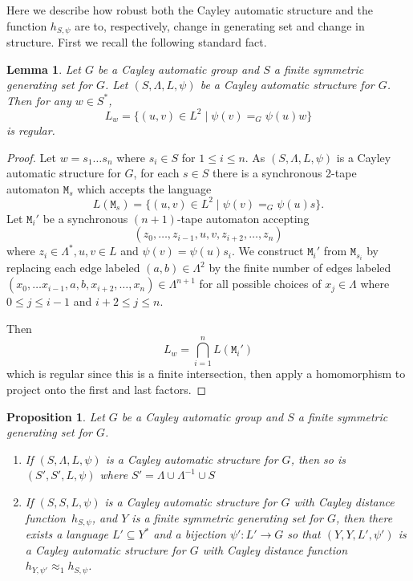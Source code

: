 \documentclass[11pt]{amsart}
\newcommand{\be}{\begin{enumerate}}
\newcommand{\ee}{\end{enumerate}}
\newcommand{\approxF}{\approx_1}
\newtheorem{lemma}[theorem]{Lemma}
\newtheorem{proposition}[theorem]{Proposition}
\theoremstyle{definition}
\newcommand\distfun{Cayley distance function}
\begin{document}
Here we describe how robust both the Cayley automatic structure and the function $h_{S,\psi}$ are to, respectively, change in generating set and change in structure.
First we recall the following standard fact.
\begin{lemma}\label{lem:2tape}
Let $G$ be a Cayley automatic group and $S$ a  finite symmetric generating set for $G$.
Let $(S,\Lambda,L,\psi)$ be a Cayley automatic structure for $G$.
Then for any $w\in S^*$,
\[L_w=\{(u,v)\in L^2\mid \psi(v)=_G\psi(u)w\}\] is regular.
\end{lemma}
\begin{proof}
Let $w=s_1\dots s_n$ where $s_i\in S$ for $1 \leq i \leq n$.
As $(S,\Lambda,L,\psi)$ is a Cayley automatic structure for $G$, for each $s \in S$ there is a synchronous 2-tape automaton $\texttt{M}_{s}$  which accepts the language $$L(\texttt{M}_{s})=\{(u,v)\in L^2\mid \psi(v)=_G\psi(u)s\}.$$
Let $\texttt{M}_i'$ be a synchronous  $(n+1)$-tape automaton accepting  \[(z_0, \dots, z_{i-1}, u, v, z_{i+2},\dots, z_n)\] where $z_i\in \Lambda^*, u,v\in L$ and  $\psi(v)=\psi(u)s_i$.
We construct $\texttt{M}_i'$ from $\texttt{M}_{s_i}$ by replacing each edge labeled $(a,b)\in \Lambda^2$ by the finite number of edges
labeled $(x_0,\dots x_{i-1},a,b,x_{i+2},\dots ,x_n)\in \Lambda^{n+1}$ for all possible choices of $x_j \in \Lambda$
where $0\leq j \leq i-1$ and $i+2 \leq j \leq n$.

Then \[L_w=\bigcap_{i=1}^n  L(\texttt{M}_i')\] which is regular since this is a finite intersection, then apply a homomorphism to project onto the first and last factors.
\end{proof}

\begin{proposition}\label{prop:modifyingCAstructure}
Let $G$ be a Cayley automatic group and $S$ a  finite symmetric generating set for $G$.
\be\item If  $(S,\Lambda,L, \psi)$ is a Cayley automatic structure for  $G$, then so is $(S',S',L, \psi)$ where $S'=\Lambda\cup\Lambda^{-1}\cup S$


\item If $(S,S,L, \psi)$ is a Cayley automatic structure for  $G$ with \distfun\ $h_{S,\psi}$, and $Y$ is a   finite symmetric generating set for $G$,  then there exists a language $L'\subseteq Y^*$ and a bijection $\psi':L'\to G$ so that
 $( Y, Y,L',\psi')$ is a Cayley automatic structure for  $G$ with \distfun\  $h_{ Y,\psi'}\approxF h_{S,\psi}$.
\ee
 \end{proposition}
\end{document}
